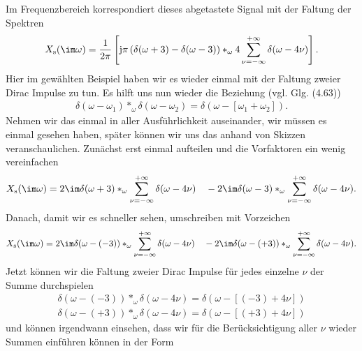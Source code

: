 \begin{ExCalc}
Im Frequenzbereich korrespondiert dieses abgetastete Signal mit der Faltung der Spektren
\begin{equation}
X_\mathrm{s}(\im\omega) = \frac{1}{2\pi}
\left[
\mathrm{j} \pi \left( \delta(\omega+3) - \delta(\omega-3) \right)
\ast_\omega 4 \sum_{\nu=-\infty}^{+\infty} \delta(\omega-4 \nu)
\right].
\end{equation}
%
Hier im gewählten Beispiel haben wir es wieder einmal mit der Faltung zweier
Dirac Impulse zu tun. Es hilft uns nun wieder die Beziehung (vgl. Glg. (4.63))
\begin{align}
\delta(\omega-\omega_1) \ast_\omega \delta(\omega-\omega_2)=
\delta(\omega-[\omega_1+\omega_2]).
\end{align}
Nehmen wir das einmal in aller Ausführlichkeit auseinander, wir müssen es einmal
gesehen haben, später können wir uns das anhand von Skizzen veranschaulichen.
Zunächst erst einmal aufteilen und die Vorfaktoren ein wenig vereinfachen
%
%
\begin{equation}
X_\mathrm{s}(\im\omega) = 2\im
\delta(\omega+3)
\ast_\omega \sum_{\nu=-\infty}^{+\infty} \delta(\omega-4 \nu)
\quad-
2\im
\delta(\omega-3)
\ast_\omega \sum_{\nu=-\infty}^{+\infty} \delta(\omega-4 \nu).
\end{equation}
Danach, damit wir es schneller sehen, umschreiben mit Vorzeichen
\begin{equation}
X_\mathrm{s}(\im\omega) = 2\im
\delta(\omega-(-3))
\ast_\omega \sum_{\nu=-\infty}^{+\infty} \delta(\omega-4 \nu)
\quad-
2\im
\delta(\omega-(+3))
\ast_\omega \sum_{\nu=-\infty}^{+\infty} \delta(\omega-4 \nu).
\end{equation}
Jetzt können wir die Faltung zweier Dirac Impulse für jedes einzelne $\nu$
der Summe durchspielen
\begin{align}
\delta(\omega-(-3)) \ast_\omega \delta(\omega-4 \nu) = \delta(\omega - [(-3)+4\nu])\\
\delta(\omega-(+3)) \ast_\omega \delta(\omega-4 \nu) = \delta(\omega - [(+3)+4\nu])
\end{align}
und können irgendwann einsehen, dass wir für die Berücksichtigung aller $\nu$
wieder Summen einführen können in der Form

\end{ExCalc}
